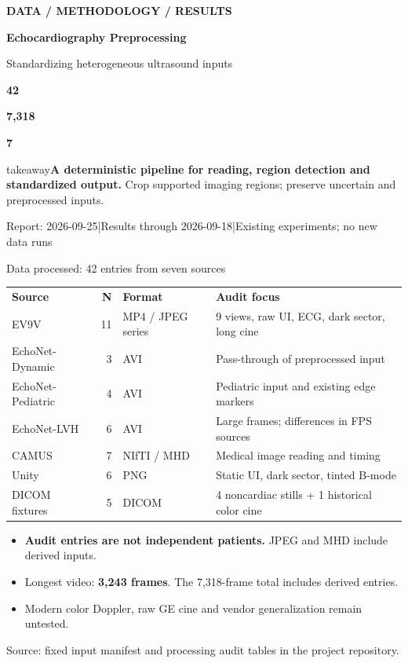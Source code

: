 \documentclass[aspectratio=169,10pt]{beamer}
\newcommand{\source}[1]{\par\vfill{\fontsize{6.1}{8}\selectfont\color{Muted}#1\par}}
\newcommand{\takeaway}[1]{\vspace{5pt}\begin{beamercolorbox}[wd=\linewidth,sep=6pt]{takeaway}\small #1\end{beamercolorbox}}
\newcommand{\metric}[3]{\begin{minipage}[t]{#1}\centering
  {\fontsize{30}{34}\selectfont\bfseries\color{Teal}#2}\par\vspace{3pt}{\small #3}\end{minipage}}
\begin{document}
\begin{frame}[t]
  \vspace{8mm}
  {\small\color{Teal}\bfseries DATA / METHODOLOGY / RESULTS}\par\vspace{4mm}
  {\fontsize{25}{31}\selectfont\bfseries Echocardiography Preprocessing}\par\vspace{2mm}
  {\fontsize{15}{20}\selectfont Standardizing heterogeneous ultrasound inputs}\par\vspace{8mm}
  \metric{.31\linewidth}{42}{processed audit entries}\hfill
  \metric{.31\linewidth}{7,318}{total input frames}\hfill
  \metric{.31\linewidth}{7}{input sources}\par\vspace{5mm}
  \takeaway{\textbf{A deterministic pipeline for reading, region detection and standardized output.} Crop supported imaging regions; preserve uncertain and preprocessed inputs.}
  \source{Report: 2026-09-25\quad |\quad Results through 2026-09-18\quad |\quad Existing experiments; no new data runs}
\end{frame}

\begin{frame}[t]{Data processed: 42 entries from seven sources}
  \small
  \begin{tabularx}{\linewidth}{@{}l r l Y@{}}
    \textbf{Source}&\textbf{N}&\textbf{Format}&\textbf{Audit focus}\\
    EV9V&11&MP4 / JPEG series&9 views, raw UI, ECG, dark sector, long cine\\
    EchoNet-Dynamic&3&AVI&Pass-through of preprocessed input\\
    EchoNet-Pediatric&4&AVI&Pediatric input and existing edge markers\\
    EchoNet-LVH&6&AVI&Large frames; differences in FPS sources\\
    CAMUS&7&NIfTI / MHD&Medical image reading and timing\\
    Unity&6&PNG&Static UI, dark sector, tinted B-mode\\
    DICOM fixtures&5&DICOM&4 noncardiac stills + 1 historical color cine\\
    \bottomrule
  \end{tabularx}
  \vspace{4pt}
  \begin{itemize}\setlength{\itemsep}{3pt}
    \item \textbf{Audit entries are not independent patients.} JPEG and MHD include derived inputs.
    \item Longest video: \textbf{3,243 frames}. The 7,318-frame total includes derived entries.
    \item Modern color Doppler, raw GE cine and vendor generalization remain untested.
  \end{itemize}
  \source{Source: fixed input manifest and processing audit tables in the project repository.}
\end{frame}
\end{document}
